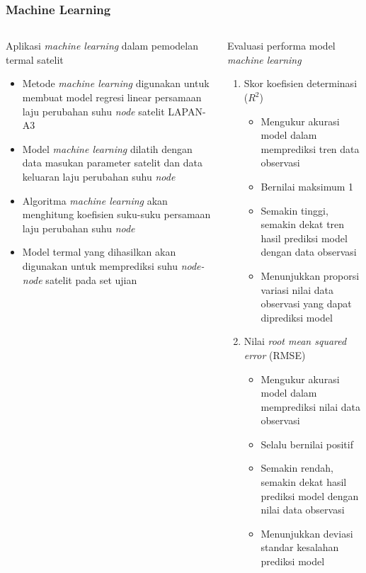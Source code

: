\documentclass[8pt]{beamer}
\begin{document}
\begin{frame}
  \frametitle{Machine Learning}
  \begin{columns}[T]
    \begin{block}{\center Aplikasi \textit{machine learning} dalam pemodelan termal satelit}
      \begin{itemize}
        \item Metode \textit{machine learning} digunakan untuk membuat model regresi linear persamaan laju perubahan suhu \textit{node} satelit LAPAN-A3
        \item Model \textit{machine learning} dilatih dengan data masukan parameter satelit dan data keluaran laju perubahan suhu \textit{node}
        \item Algoritma \textit{machine learning} akan menghitung koefisien suku-suku persamaan laju perubahan suhu \textit{node}
        \item Model termal yang dihasilkan akan digunakan untuk memprediksi suhu \textit{node-node} satelit pada set ujian
      \end{itemize}
    \end{block}
    \begin{block}{\center Evaluasi performa model \\ \textit{machine learning}}
      \begin{enumerate}
        \item Skor koefisien determinasi ($R^2$) \cite{gupta2021}
          \begin{itemize}
            \item Mengukur akurasi model dalam memprediksi tren data observasi
            \item Bernilai maksimum 1
            \item Semakin tinggi, semakin dekat tren hasil prediksi model dengan data observasi
            \item Menunjukkan proporsi variasi nilai data observasi yang dapat diprediksi model
          \end{itemize}
        \item Nilai \textit{root mean squared error} (RMSE) \cite{zheng}
          \begin{itemize}
            \item Mengukur akurasi model dalam memprediksi nilai data observasi
            \item Selalu bernilai positif
            \item Semakin rendah, semakin dekat hasil prediksi model dengan nilai data observasi
            \item Menunjukkan deviasi standar kesalahan prediksi model
          \end{itemize}
        \end{enumerate}
    \end{block}
  \end{columns}
\end{frame}
\end{document}

